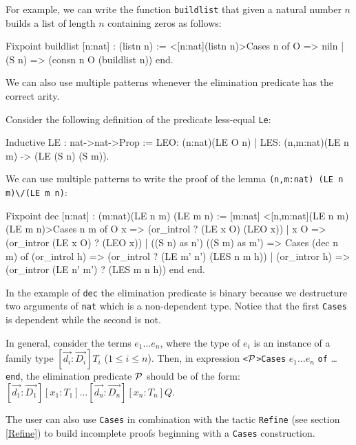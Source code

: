 For example, we can write 
the function \texttt{buildlist} that given a natural number
$n$ builds a list of length $n$ containing zeros as follows:

\begin{coq_example}
Fixpoint buildlist [n:nat] : (listn n) :=
    <[n:nat](listn n)>Cases n of 
           O    => niln 
       |  (S n) => (consn n O (buildlist n))
       end.
\end{coq_example}

We can also use multiple patterns whenever the elimination predicate has
the correct arity. 

Consider the following definition of the predicate less-equal
\texttt{Le}:

\begin{coq_example}
Inductive LE : nat->nat->Prop :=
  LEO: (n:nat)(LE O n)
| LES: (n,m:nat)(LE n m) -> (LE (S n) (S m)).
\end{coq_example}

We can use multiple patterns to write  the proof of the lemma
 \texttt{(n,m:nat) (LE n m)}\verb=\/=\texttt{(LE m n)}:

\begin{coq_example}
Fixpoint dec  [n:nat] : (m:nat)(LE n m) \/ (LE m n) :=
 [m:nat] <[n,m:nat](LE n m) \/ (LE m n)>Cases n m of
           O   x =>  (or_introl ? (LE x O) (LEO x))
         | x   O =>  (or_intror (LE x O) ? (LEO x))
         | ((S n) as n') ((S m) as m') =>
              Cases (dec n m) of
                  (or_introl h) => (or_introl ? (LE m' n') (LES n m h))
               |  (or_intror h) => (or_intror (LE n' m') ? (LES m n h))
              end
        end.
\end{coq_example}
In the example of \texttt{dec} the elimination predicate is binary
because we destructure two arguments of \texttt{nat} which is a
non-dependent type. Notice that the first \texttt{Cases} is dependent while 
the second is not.

In general, consider the terms $e_1\ldots e_n$,
where  the type of $e_i$ is an instance of a family type
$[\vec{d_i}:\vec{D_i}]T_i$  ($1\leq i
\leq n$). Then, in expression \texttt{<}${\cal P}$\texttt{>Cases}  $e_1\ldots
e_n$ \texttt{of} \ldots \texttt{end}, the 
elimination predicate ${\cal P}$ should be of the form:
$[\vec{d_1}:\vec{D_1}][x_1:T_1]\ldots [\vec{d_n}:\vec{D_n}][x_n:T_n]Q.$

The user can also use \texttt{Cases} in combination with the tactic
\texttt{Refine} (see section \ref{Refine}) to build incomplete proofs
beginning with a \texttt{Cases} construction.

